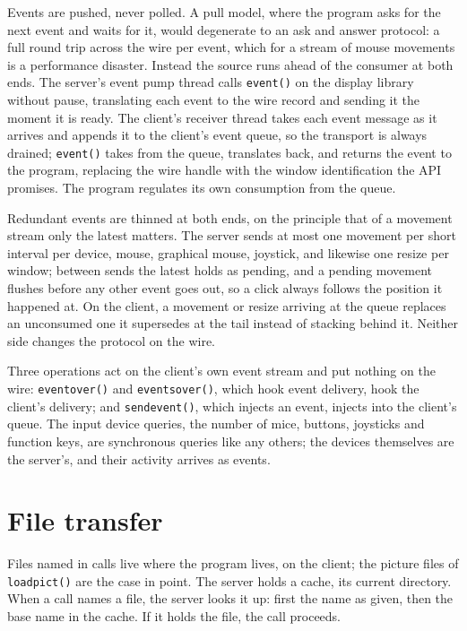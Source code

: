 \documentclass[11pt]{article}
\begin{document}
Events are pushed, never polled. A pull model, where the program asks for
the next event and waits for it, would degenerate to an ask and answer
protocol: a full round trip across the wire per event, which for a stream
of mouse movements is a performance disaster. Instead the source runs
ahead of the consumer at both ends. The server's event pump thread calls
\texttt{event()} on the display library without pause, translating each
event to the wire record and sending it the moment it is ready. The
client's receiver thread takes each event message as it arrives and
appends it to the client's event queue, so the transport is always
drained; \texttt{event()} takes from the queue, translates back, and
returns the event to the program, replacing the wire handle with the
window identification the API promises. The program regulates its own
consumption from the queue.

Redundant events are thinned at both ends, on the principle that of a
movement stream only the latest matters. The server sends at most one
movement per short interval per device, mouse, graphical mouse, joystick,
and likewise one resize per window; between sends the latest holds as
pending, and a pending movement flushes before any other event goes out,
so a click always follows the position it happened at. On the client, a
movement or resize arriving at the queue replaces an unconsumed one it
supersedes at the tail instead of stacking behind it. Neither side changes
the protocol on the wire.

Three operations act on the client's own event stream and put nothing on
the wire: \texttt{eventover()} and \texttt{eventsover()}, which hook event
delivery, hook the client's delivery; and \texttt{sendevent()}, which
injects an event, injects into the client's queue. The input device
queries, the number of mice, buttons, joysticks and function keys, are
synchronous queries like any others; the devices themselves are the
server's, and their activity arrives as events.

\section{File transfer}

Files named in calls live where the program lives, on the client; the
picture files of \texttt{loadpict()} are the case in point. The server
holds a cache, its current directory. When a call names a file, the server
looks it up: first the name as given, then the base name in the cache. If
it holds the file, the call proceeds.
\end{document}
